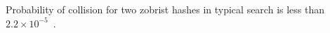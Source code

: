 	Probability of collision for two zobrist hashes in typical search is less
	than $2.2 \times 10^{-5}$~\cite{COX}.

% 
% 

